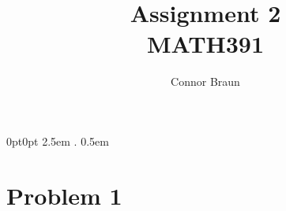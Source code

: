 \documentclass[11pt, letterpaper]{article}
\begin{document}
\title{Assignment 2\\\normalsize MATH391}
\author{Connor Braun}

\allowdisplaybreaks

\theoremstyle{definition}
\newtheorem*{prf}{Proof}
\newtheorem{recipe}{Recipe}
\newtheorem*{sol}{Solution}
\newtheorem{case}{Case}
    {0pt}{0pt}
    {\hangindent 2.5em}
    {}
    {\bfseries}
    {.}
    {0.5em}
    {}
\theoremstyle{mythrm}
\newtheorem{lemma}{Lemma}

\maketitle
\section*{Problem 1}
\end{document}
